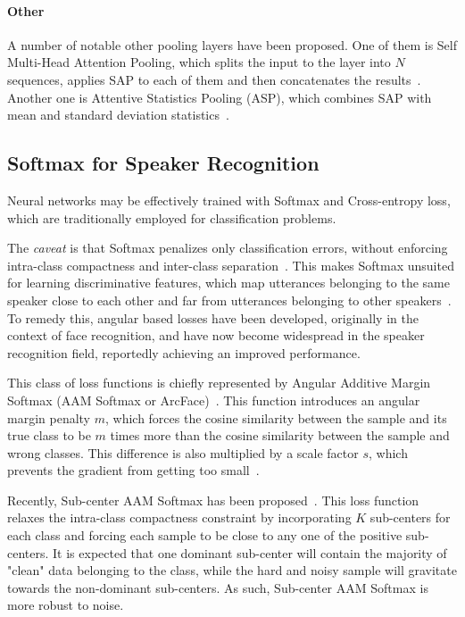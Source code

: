 \documentclass[conference]{IEEEtran}
\begin{document}
\paragraph{Other}A number of notable other pooling layers have been proposed. One of them is Self Multi-Head Attention Pooling, which splits the input to the layer into $N$ sequences, applies SAP to each of them and then concatenates the results~\cite{india2019selfmha}. Another one is Attentive Statistics Pooling (ASP), which combines SAP with mean and standard deviation statistics~\cite{okabe2018asp}.

\subsection{Softmax for Speaker Recognition}

Neural networks may be effectively trained with Softmax and Cross-entropy loss, which are traditionally employed for classification problems. 

The \textit{caveat} is that Softmax penalizes only classification errors, without enforcing intra-class compactness and inter-class separation~\cite{chung2020defence}. This makes Softmax unsuited for learning discriminative features, which map utterances belonging to the same speaker close to each other and far from utterances belonging to other speakers~\cite{liu2019large}. To remedy this, angular based losses have been developed, originally in the context of face recognition, and have now become widespread in the speaker recognition field, reportedly achieving an improved performance.

This class of loss functions is chiefly represented by Angular Additive Margin Softmax (AAM Softmax or ArcFace)~\cite{deng2019arcface}. This function introduces an angular margin penalty $m$, which forces the cosine similarity between the sample and its true class to be $m$ times more than the cosine similarity between the sample and wrong classes. This difference is also multiplied by a scale factor $s$, which prevents the gradient from getting too small~\cite{chung2020defence,hajibabaei2018unified}.

Recently, Sub-center AAM Softmax has been proposed~\cite{deng2020subarcface}. This loss function relaxes the intra-class compactness constraint by incorporating $K$ sub-centers for each class and forcing each sample to be close to any one of the positive sub-centers. It is expected that one dominant sub-center will contain the majority of "clean" data belonging to the class, while the hard and noisy sample will gravitate towards the non-dominant sub-centers. As such, Sub-center AAM Softmax is more robust to noise.
\end{document}
